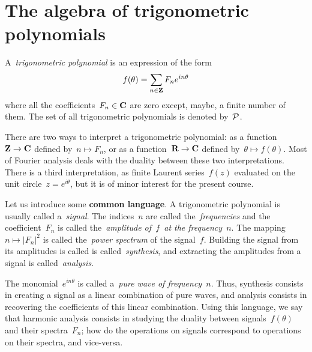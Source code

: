 \vfill

\clearpage
\section{The algebra of trigonometric polynomials}


\begin{definition}
A~\emph{trigonometric polynomial} is an expression of the form
$$
	f(\theta)=\sum_{n\in\mathbf{Z}} F_n e^{in\theta}
$$
where all the coefficients~$F_n\in\mathbf{C}$ are zero except, maybe, a finite
number of them.  The set of all trigonometric polynomials is denoted
by~$\mathcal{P}$.
\end{definition}

There are two ways to interpret a trigonometric polynomial: as a
function~$\mathbf{Z}\to\mathbf{C}$ defined by~$n\mapsto F_n$, or as a function~$\mathbf{R}\to\mathbf{C}$
defined by~$\theta\mapsto f(\theta)$.
Most of Fourier analysis deals with
the duality between these two interpretations.
There is a third interpretation, as finite Laurent series~$f(z)$ evaluated on
the unit circle~$z=e^{i\theta}$, but it is of minor interest for the present
course.

Let us introduce some {\bf common language}.
A trigonometric polynomial is usually called a~\emph{signal}.  The
indices~$n$ are called the~\emph{frequencies} and the coefficient~$F_n$
is called the~\emph{amplitude of~$f$~at the frequency~$n$}.  The
mapping~$n\mapsto\left|F_n\right|^2$ is called the~\emph{power
spectrum} of the signal~$f$.  Building the signal from its amplitudes
is called is called~\emph{synthesis}, and extracting the amplitudes
from a signal is called~\emph{analysis}.

The monomial~$e^{in\theta}$ is called a~\emph{pure wave of frequency~$n$}.
Thus, synthesis consists in creating a signal as a linear combination of pure
waves, and analysis consists in recovering the coefficients of this linear
combination.  Using this language, we say that harmonic analysis consists in
studying the duality between signals~$f(\theta)$ and their spectra~$F_n$; how
do the operations on signals correspond to operations on their spectra, and
vice-versa.



